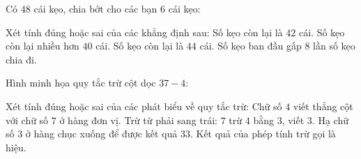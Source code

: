 \begin{ex} %
Có $48$ cái kẹo, chia bớt cho các bạn $6$ cái kẹo:
\begin{center}
\end{center}
Xét tính đúng hoặc sai của các khẳng định sau:
\choiceTF
{\True Số kẹo còn lại là $42$ cái.}
{\True Số kẹo còn lại nhiều hơn $40$ cái.}
{Số kẹo còn lại là $44$ cái.}
{\True Số kẹo ban đầu gấp $8$ lần số kẹo chia đi.}
\end{ex}

\begin{ex} %
Hình minh họa quy tắc trừ cột dọc $37 - 4$:
\begin{center}
\end{center}
Xét tính đúng hoặc sai của các phát biểu về quy tắc trừ:
\choiceTF
{\True Chữ số $4$ viết thẳng cột với chữ số $7$ ở hàng đơn vị.}
{\True Trừ từ phải sang trái: $7$ trừ $4$ bằng $3$, viết $3$.}
{Hạ chữ số $3$ ở hàng chục xuống để được kết quả $33$.}
{\True Kết quả của phép tính trừ gọi là hiệu.}
\end{ex}

